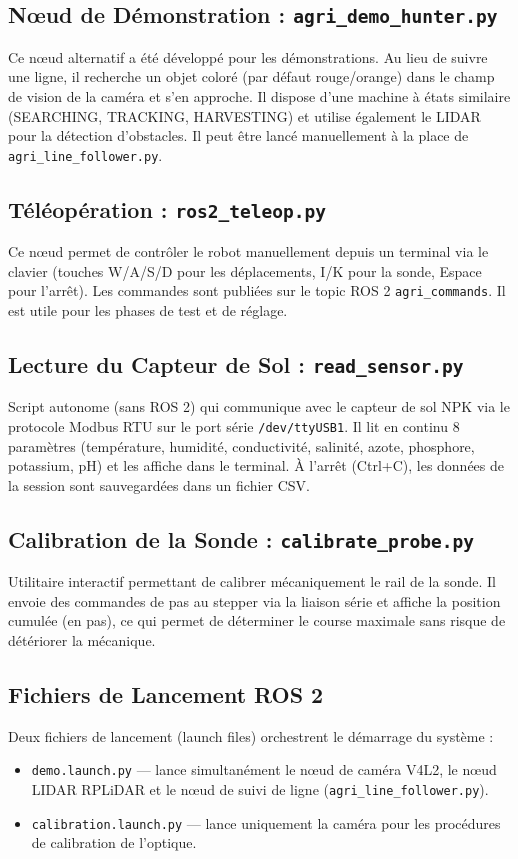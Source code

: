 \documentclass [12pt, a4paper]{article}
\begin{document}
\subsection{Nœud de Démonstration : \texttt{agri\_demo\_hunter.py}}
Ce nœud alternatif a été développé pour les démonstrations. Au lieu de suivre une ligne, il recherche un objet coloré (par défaut rouge/orange) dans le champ de vision de la caméra et s'en approche. Il dispose d'une machine à états similaire (SEARCHING, TRACKING, HARVESTING) et utilise également le LIDAR pour la détection d'obstacles. Il peut être lancé manuellement à la place de \texttt{agri\_line\_follower.py}.

\subsection{Téléopération : \texttt{ros2\_teleop.py}}
Ce nœud permet de contrôler le robot manuellement depuis un terminal via le clavier (touches W/A/S/D pour les déplacements, I/K pour la sonde, Espace pour l'arrêt). Les commandes sont publiées sur le topic ROS 2 \texttt{agri\_commands}. Il est utile pour les phases de test et de réglage.

\subsection{Lecture du Capteur de Sol : \texttt{read\_sensor.py}}
Script autonome (sans ROS 2) qui communique avec le capteur de sol NPK via le protocole Modbus RTU sur le port série \texttt{/dev/ttyUSB1}. Il lit en continu 8 paramètres (température, humidité, conductivité, salinité, azote, phosphore, potassium, pH) et les affiche dans le terminal. À l'arrêt (Ctrl+C), les données de la session sont sauvegardées dans un fichier CSV.

\subsection{Calibration de la Sonde : \texttt{calibrate\_probe.py}}
Utilitaire interactif permettant de calibrer mécaniquement le rail de la sonde. Il envoie des commandes de pas au stepper via la liaison série et affiche la position cumulée (en pas), ce qui permet de déterminer le course maximale sans risque de détériorer la mécanique.

\subsection{Fichiers de Lancement ROS 2}
Deux fichiers de lancement (launch files) orchestrent le démarrage du système :
\begin{itemize}
    \item \texttt{demo.launch.py} — lance simultanément le nœud de caméra V4L2, le nœud LIDAR RPLiDAR et le nœud de suivi de ligne (\texttt{agri\_line\_follower.py}).
    \item \texttt{calibration.launch.py} — lance uniquement la caméra pour les procédures de calibration de l'optique.
\end{itemize}
\end{document}
